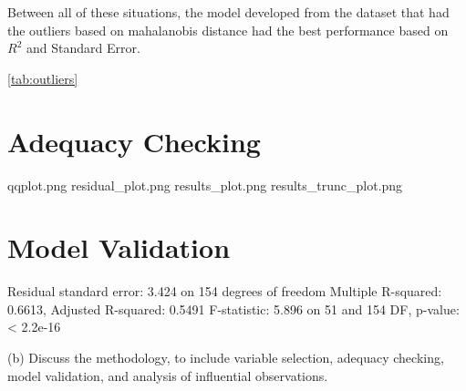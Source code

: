 Between all of these situations, the model developed from the dataset that had the outliers 
based on mahalanobis distance had the best performance based on $R^2$ and Standard Error.

\ref{tab:outliers}




\section{Adequacy Checking}


qqplot.png
residual_plot.png
results_plot.png
results_trunc_plot.png

\section{Model Validation}










Residual standard error: 3.424 on 154 degrees of freedom 
Multiple R-squared:  0.6613,	Adjusted R-squared:  0.5491 
F-statistic: 5.896 on 51 and 154 DF,  p-value: < 2.2e-16







(b) Discuss the methodology, to include variable selection, adequacy checking, model validation, and analysis of influential observations.



